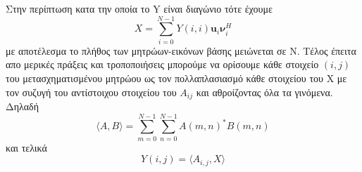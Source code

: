 \hspace*{\fill}\newline
\newline
Στην περίπτωση κατα την οποία το Y είναι διαγώνιο τότε έχουμε \\
\newline\hspace*{\fill}
\begin{equation}
        Χ = \sum_{i=0}^{N-1} Y(i,i)\mathbf{u}_{i}\mathbf{\nu}_{i}^{H}
\end{equation}
\hspace*{\fill}\newline
\newline
με αποτέλεσμα το πλήθος των μητρώων-εικόνων βάσης μειώνεται σε Ν. Τέλος έπειτα απο μερικές πράξεις και τροποποιήσεις μπορούμε να ορίσουμε κάθε στοιχείο $(i,j)$ του μετασχηματισμένου μητρώου ως τον πολλαπλασιασμό κάθε στοιχείου του Χ με τον συζυγή του αντίστοιχου στοιχείου του $Α_{ij}$ και αθροίζοντας όλα τα γινόμενα. Δηλαδή
\newline\hspace*{\fill}
\begin{equation}
        \langle A,B \rangle = \sum_{m=0}^{N-1} \sum_{n=0}^{N-1} A(m,n)^{*}B(m,n)
\end{equation}
\hspace*{\fill}\newline
και τελικά
\newline\hspace*{\fill}
\begin{equation}
        Y(i,j) = \langle A_{i,j},X \rangle
\end{equation}
\hspace*{\fill}\newline

